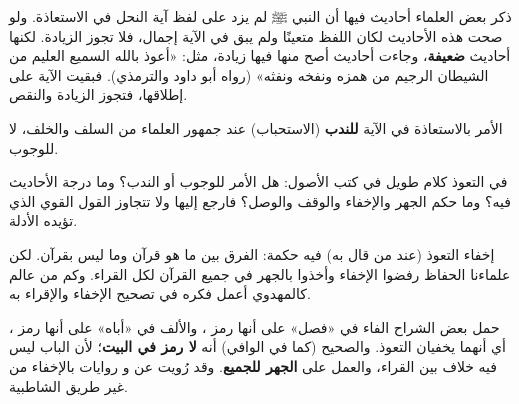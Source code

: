 \begin{mufradat}
\end{mufradat}
\maana ذكر بعض العلماء أحاديث فيها أن النبي ﷺ لم يزد على لفظ آية النحل في الاستعاذة. ولو صحت هذه الأحاديث لكان اللفظ متعينًا ولم يبق في الآية إجمال، فلا تجوز الزيادة. لكنها أحاديث \textbf{ضعيفة}، وجاءت أحاديث أصح منها فيها زيادة، مثل: «أعوذ بالله السميع العليم من الشيطان الرجيم من همزه ونفخه ونفثه» (رواه أبو داود والترمذي). فبقيت الآية على إطلاقها، فتجوز الزيادة والنقص.

\begin{tanbih}
الأمر بالاستعاذة في الآية \textbf{للندب} (الاستحباب) عند جمهور العلماء من السلف والخلف، لا للوجوب.
\end{tanbih}

\begin{mufradat}
\end{mufradat}
\maana في التعوذ كلام طويل في كتب الأصول: هل الأمر للوجوب أو الندب؟ وما درجة الأحاديث فيه؟ وما حكم الجهر والإخفاء والوقف والوصل؟ فارجع إليها ولا تتجاوز القول القوي الذي تؤيده الأدلة.

\begin{mufradat}
\end{mufradat}
\maana إخفاء التعوذ (عند من قال به) فيه حكمة: الفرق بين ما هو قرآن وما ليس بقرآن. لكن علماءنا الحفاظ رفضوا الإخفاء وأخذوا بالجهر في جميع القرآن لكل القراء. وكم من عالم كالمهدوي أعمل فكره في تصحيح الإخفاء والإقراء به.

\begin{tanbih}
حمل بعض الشراح الفاء في «فصل» على أنها رمز \Hamza، والألف في «أباه» على أنها رمز \Nafi، أي أنهما يخفيان التعوذ. والصحيح (كما في الوافي) أنه \textbf{لا رمز في البيت}؛ لأن الباب ليس فيه خلاف بين القراء، والعمل على \textbf{الجهر للجميع}. وقد رُويت عن \Hamza{} و\Nafi{} روايات بالإخفاء من غير طريق الشاطبية.
\end{tanbih}

